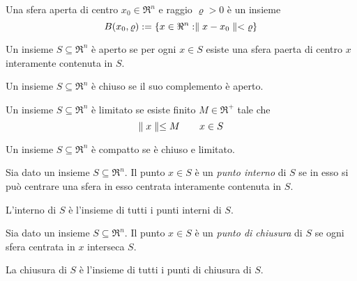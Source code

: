 \begin{definition}
	\label{dfn:sphere-open}
	Una sfera aperta di centro $x_{0}\in\Re^{n}$ e raggio $\varrho>0$  è un insieme
	\begin{equation}
	\label{eqn:sphere-open}
	B(x_{0},\varrho):=\{x\in\Re^{n}:\parallel x-x_{0} \parallel<\varrho\}
	\end{equation}
\end{definition}

\begin{definition}
	\label{dfn:set-open}
	Un insieme $S\subseteq\Re^{n}$ è aperto se per ogni $x\in S$ esiste una sfera paerta di centro $x$ interamente contenuta in $S$.
\end{definition}

\begin{definition}
	\label{dfn:set-closed}
	Un insieme $S\subseteq\Re^{n}$ è chiuso se il suo complemento è aperto.
\end{definition}

\begin{definition}
	\label{dfn:set-limited}
	Un insieme $S\subseteq\Re^{n}$ è limitato se esiste finito $M\in\Re^{+}$ tale che
	\begin{equation}
	\label{eqn:set-limited}
	\parallel x \parallel\leq M \qquad x\in S
	\end{equation}
\end{definition}

\begin{definition}
	\label{dfn:set-compact}
	Un insieme $S\subseteq\Re^{n}$ è compatto se è chiuso e limitato.
\end{definition}

\begin{definition}
	\label{dfn:set-inner}
	Sia dato un insieme $S\subseteq\Re^{n}$. Il punto $x\in S$ è un \textit{punto interno} di $S$ se in esso si può centrare una sfera in esso centrata interamente contenuta in $S$.

	L'interno di $S$ è l'insieme di tutti i punti interni di $S$.
\end{definition}

\begin{definition}
	\label{dfn:set-closing}
	Sia dato un insieme $S\subseteq\Re^{n}$. Il punto $x\in S$ è un \textit{punto di chiusura} di $S$ se ogni sfera centrata in $x$ interseca $S$.

	La chiusura di $S$ è l'insieme di tutti i punti di chiusura di $S$.
\end{definition}

